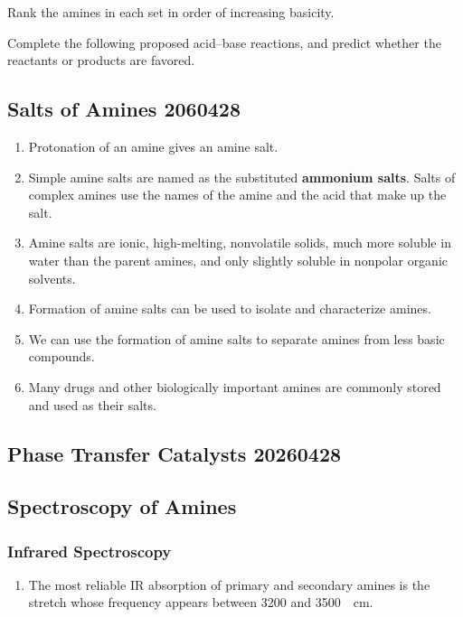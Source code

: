 \begin{example} %
    Rank the amines in each set in order of increasing basicity.
\end{example}

\begin{example} %
    Complete the following proposed acid–base reactions, and predict whether the reactants or products are favored.
\end{example}

\subsection{Salts of Amines 2060428}

\begin{enumerate}
    \item Protonation of an amine gives an amine salt.
    \item Simple amine salts are named as the substituted \textbf{ammonium salts}. Salts of complex amines use the names of the amine and the acid that make up the salt.
    \item Amine salts are ionic, high-melting, nonvolatile solids, much more soluble in water than the parent amines, and only slightly soluble in nonpolar organic solvents.
    \item Formation of amine salts can be used to isolate and characterize amines.
    \item We can use the formation of amine salts to separate amines from less basic compounds. %
    \item Many drugs and other biologically important amines are commonly stored and used as their salts.
\end{enumerate}

\subsection{Phase Transfer Catalysts 20260428}

\subsection{Spectroscopy of Amines}

\subsubsection{Infrared Spectroscopy}

\begin{enumerate}
    \item The most reliable IR absorption of primary and secondary amines is the  stretch whose frequency appears between \qty{3200}{} and \qty{3500}{\per\centi\meter}. 
\end{enumerate}

